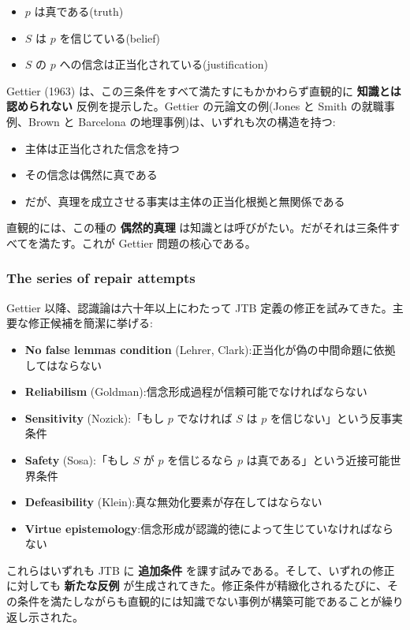 \begin{itemize}
\item $p$ は真である(truth)
\item $S$ は $p$ を信じている(belief)
\item $S$ の $p$ への信念は正当化されている(justification)
\end{itemize}

Gettier (1963) \citep{Gettier1963} は、この三条件をすべて満たすにもかかわらず直観的に \textbf{知識とは認められない} 反例を提示した。Gettier の元論文の例(Jones と Smith の就職事例、Brown と Barcelona の地理事例)は、いずれも次の構造を持つ:

\begin{itemize}
\item 主体は正当化された信念を持つ
\item その信念は偶然に真である
\item だが、真理を成立させる事実は主体の正当化根拠と無関係である
\end{itemize}

直観的には、この種の \textbf{偶然的真理} は知識とは呼びがたい。だがそれは三条件すべてを満たす。これが Gettier 問題の核心である。

\subsubsection{The series of repair attempts}


Gettier 以降、認識論は六十年以上にわたって JTB 定義の修正を試みてきた。主要な修正候補を簡潔に挙げる:

\begin{itemize}
\item \textbf{No false lemmas condition} (Lehrer, Clark):正当化が偽の中間命題に依拠してはならない
\item \textbf{Reliabilism} (Goldman):信念形成過程が信頼可能でなければならない
\item \textbf{Sensitivity} (Nozick):「もし $p$ でなければ $S$ は $p$ を信じない」という反事実条件
\item \textbf{Safety} (Sosa):「もし $S$ が $p$ を信じるなら $p$ は真である」という近接可能世界条件
\item \textbf{Defeasibility} (Klein):真な無効化要素が存在してはならない
\item \textbf{Virtue epistemology}:信念形成が認識的徳によって生じていなければならない
\end{itemize}

これらはいずれも JTB に \textbf{追加条件} を課す試みである。そして、いずれの修正に対しても \textbf{新たな反例} が生成されてきた。修正条件が精緻化されるたびに、その条件を満たしながらも直観的には知識でない事例が構築可能であることが繰り返し示された。

